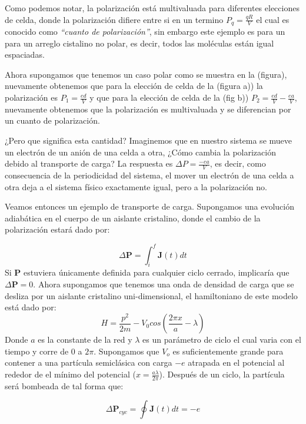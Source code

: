 Como podemos notar, la polarización está multivaluada para diferentes elecciones de celda, donde la polarización difiere entre si en un termino $P_q = \frac{qR}{V}$ el cual es conocido como \textit{``cuanto de polarización''}, sin embargo este ejemplo es para un para un arreglo cistalino no polar, es decir, todos las moléculas están igual espaciadas. 

Ahora supongamos que tenemos un caso polar como se muestra en la (figura), nuevamente obtenemos que para la elección de celda de la (figura a)) la polarización es $P_1 = \frac{ed}{V}$ y que para la elección de celda de la (fig b)) $P_2 = \frac{ed}{V} - \frac{ea}{V}$, nuevamente obtenemos que la polarización es multivaluada y se diferencian por un cuanto de polarización.

¿Pero que significa esta cantidad? Imaginemos que en nuestro sistema se mueve un electrón de un anión de una celda a otra, ¿Cómo cambia la polarización debido al transporte de carga? La respuesta es $\Delta P = \frac{-ea}{V}$, es decir, como consecuencia de la periodicidad del sistema, el mover un electrón de una celda a otra deja a el sistema físico exactamente igual, pero a la polarización no.

Veamos entonces un ejemplo de transporte de carga. Supongamos una evolución adiabática en el cuerpo de un aislante cristalino, donde el cambio de la polarización estará dado por:

\begin{equation}
    \Delta \textbf{P} = \int_i^f \textbf{J}(t)dt
\end{equation}
Si \textbf{P} estuviera únicamente definida para cualquier ciclo cerrado, implicaría que  $\Delta \textbf{P} = 0$. Ahora supongamos que tenemos una onda de densidad de carga que se desliza por un aislante cristalino uni-dimensional, el hamiltoniano de este modelo está dado por:
\begin{equation}
    H =  \frac{p^2}{2m} - V_0 cos(\frac{2\pi x}{a} - \lambda)
\end{equation}
Donde $a$ es la constante de la red y $\lambda$ es un parámetro de ciclo el cual varia con el tiempo y corre de $0$ a $2\pi$. 
Supongamos que $V_o$ es suficientemente grande para contener a una partícula semiclásica con carga $-e$ atrapada en el potencial al rededor de el mínimo del potencial ($x = \frac{a\lambda}{2\pi}$). Después de un ciclo, la partícula será bombeada de tal forma que:

\begin{equation}
    \Delta \textbf{P}_{cyc} = \oint \textbf{J}(t)dt = -e
\end{equation}

